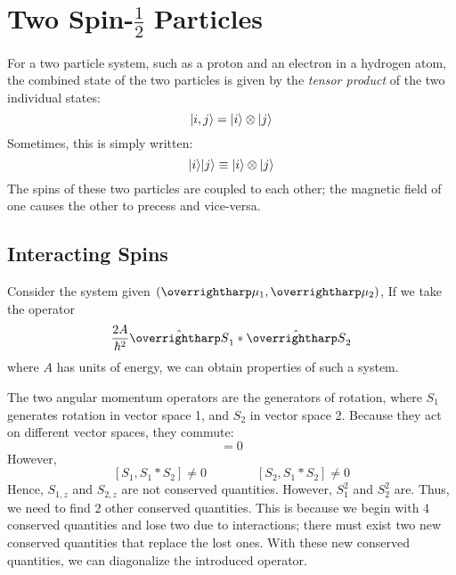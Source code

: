 \chapter{Two Spin-\texorpdfstring{\(\frac{1}{2}\)}{1/2} Particles}
For a two particle system, such as a proton and an electron in a hydrogen atom, the combined state of the two particles is given by the \emph{tensor product} of the two individual states:
\begin{equation}
	\lvert i,j\rangle=\lvert i\rangle\otimes\lvert j\rangle
\end{equation}
Sometimes, this is simply written:
\[\lvert i\rangle\lvert j\rangle\equiv\lvert i\rangle\otimes\lvert j\rangle\]
The spins of these two particles are coupled to each other; the magnetic field of one causes the other to precess and vice-versa.

\section{Interacting Spins}
Consider the system given \((\vv\mu_1, \vv\mu_2)\), If we take the operator
\begin{equation}
	\frac{2A}{\hbar^2}\hat{\vv{S}}_1*\hat{\vv{S}}_2
\end{equation}
where \(A\) has units of energy, we can obtain properties of such a system.

The two angular momentum operators are the generators of rotation, where \(S_1\) generates rotation in vector space 1, and \(S_2\) in vector space 2. Because they act on different vector spaces, they commute:
\begin{equation}
[S_1,S_2]=0
\end{equation}
However,
\[[S_1, S_1*S_2]\neq0 \qquad \qquad [S_2, S_1*S_2]\neq 0\]
Hence, \(S_{1,z}\) and \(S_{2,z}\) are not conserved quantities. However, \(S_1^2\) and \(S_2^2\) are. Thus, we need to find 2 other conserved quantities. This is because we begin with 4 conserved quantities and lose two due to interactions; there must exist two new conserved quantities that replace the lost ones. With these new conserved quantities, we can diagonalize the introduced operator.

